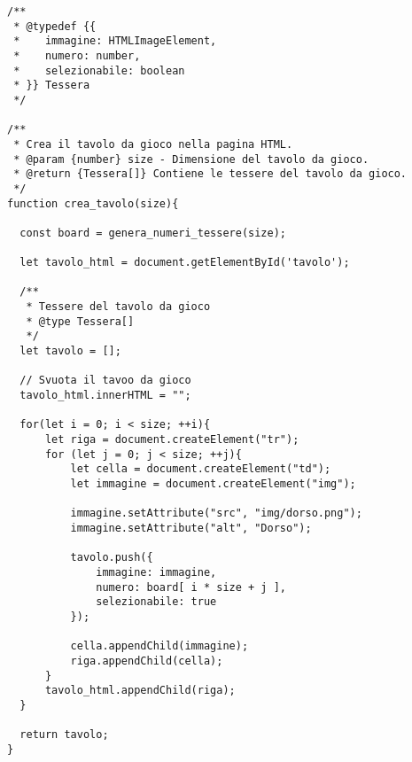 \begin{frame}[fragile]\transfade
  \begin{sol}\centering
      \begin{multicols}{2}
\begin{verbatim}
/**
 * @typedef {{
 *    immagine: HTMLImageElement,
 *    numero: number,
 *    selezionabile: boolean
 * }} Tessera
 */

/**
 * Crea il tavolo da gioco nella pagina HTML.
 * @param {number} size - Dimensione del tavolo da gioco.
 * @return {Tessera[]} Contiene le tessere del tavolo da gioco.
 */
function crea_tavolo(size){

  const board = genera_numeri_tessere(size);

  let tavolo_html = document.getElementById('tavolo');

  /**
   * Tessere del tavolo da gioco
   * @type Tessera[]
   */
  let tavolo = [];

  // Svuota il tavoo da gioco
  tavolo_html.innerHTML = "";

  for(let i = 0; i < size; ++i){
      let riga = document.createElement("tr");
      for (let j = 0; j < size; ++j){
          let cella = document.createElement("td");
          let immagine = document.createElement("img");

          immagine.setAttribute("src", "img/dorso.png");
          immagine.setAttribute("alt", "Dorso");

          tavolo.push({
              immagine: immagine,
              numero: board[ i * size + j ],
              selezionabile: true
          });

          cella.appendChild(immagine);
          riga.appendChild(cella);
      }
      tavolo_html.appendChild(riga);
  }

  return tavolo;
}
      \end{verbatim}
      \end{multicols}
  \end{sol}
\end{frame}


